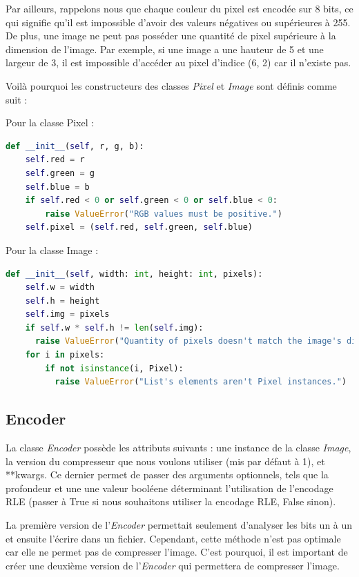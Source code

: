 \documentclass[utf8]{article}
\begin{document}
Par ailleurs, rappelons nous que chaque couleur du pixel est encodée sur 8 bits, ce qui signifie qu'il est impossible d'avoir des valeurs négatives ou supérieures à 255. De plus, une image ne peut pas posséder une quantité de pixel supérieure à la dimension de l'image. Par exemple, si une image a une hauteur de 5 et une largeur de 3, il est impossible d'accéder au pixel d'indice (6, 2) car il n'existe pas.

Voilà pourquoi les constructeurs des classes \textit{Pixel} et \textit{Image} sont définis comme suit :

Pour la classe Pixel : 
\begin{lstlisting}[language=Python]
def __init__(self, r, g, b):
    self.red = r
    self.green = g
    self.blue = b
    if self.red < 0 or self.green < 0 or self.blue < 0:
        raise ValueError("RGB values must be positive.")
    self.pixel = (self.red, self.green, self.blue)
\end{lstlisting}

Pour la classe Image : 

\begin{lstlisting}[language=Python]
 def __init__(self, width: int, height: int, pixels):
    self.w = width
    self.h = height
    self.img = pixels
    if self.w * self.h != len(self.img):
      raise ValueError("Quantity of pixels doesn't match the image's dimension.")
    for i in pixels:
        if not isinstance(i, Pixel):
		  raise ValueError("List's elements aren't Pixel instances.")
\end{lstlisting}

\subsection{Encoder}
La classe \textit{Encoder} possède les attributs suivants : une instance de la classe \textit{Image}, la version du compresseur que nous  voulons utiliser (mis par défaut à 1), et **kwargs. Ce dernier permet de passer des arguments optionnels, tels que la profondeur et une une valeur booléene déterminant l'utilisation de l'encodage RLE (passer à True si nous souhaitons utiliser la encodage RLE, False sinon).

La première version de l'\textit{Encoder} permettait seulement d'analyser les bits un à un et ensuite l'écrire dans un fichier. Cependant, cette méthode n'est pas optimale car elle ne permet pas de compresser l'image. C'est pourquoi, il est important de créer une deuxième version de l'\textit{Encoder} qui permettera  de compresser l'image.
\end{document}
